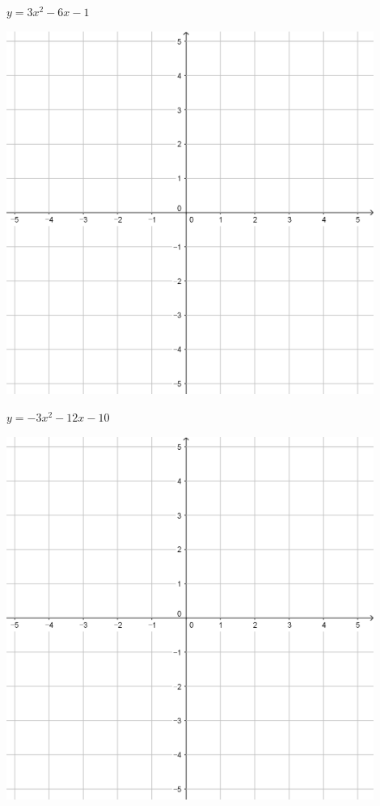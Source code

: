 \documentclass[a4paper]{oblivoir}
\begin{document}
\begin{minipage}{0.45\textwidth}\centering
\(y=3x^2-6x-1\)
\par\bigskip\includegraphics[width=0.9\textwidth]{55}
\end{minipage}
\begin{minipage}{0.45\textwidth}\centering
\(y=-3x^2-12x-10\)
\par\bigskip\includegraphics[width=0.9\textwidth]{55}
\end{minipage}\bigskip\bigskip\par
\end{document}
